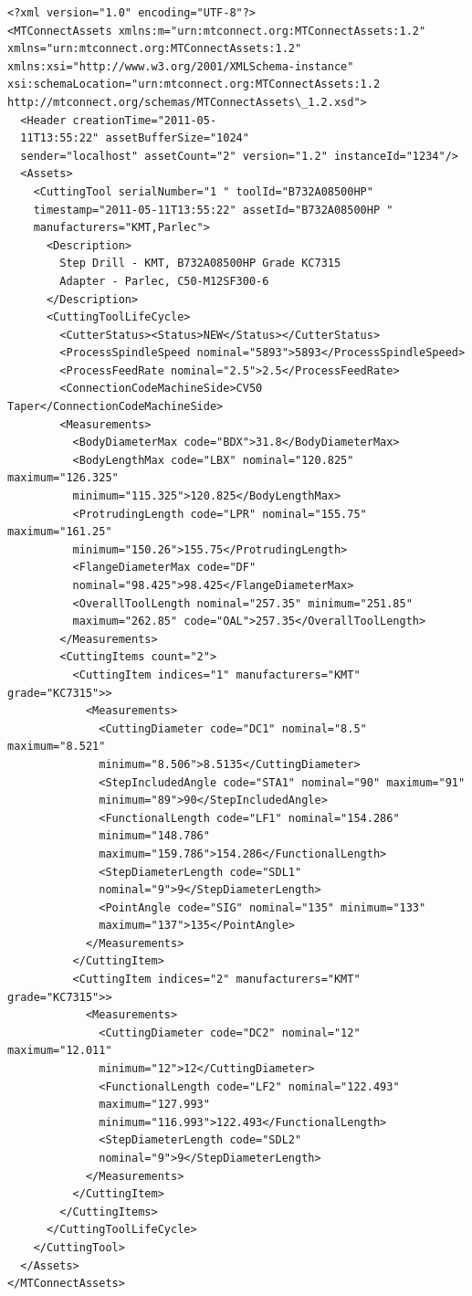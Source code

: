 \begin{lstlisting}[firstnumber=1,escapechar=|,% 
caption={Example for Step Mill Side View}, label={lst:step-drill-side-view}]
<?xml version="1.0" encoding="UTF-8"?>
<MTConnectAssets xmlns:m="urn:mtconnect.org:MTConnectAssets:1.2" 
xmlns="urn:mtconnect.org:MTConnectAssets:1.2" 
xmlns:xsi="http://www.w3.org/2001/XMLSchema-instance" 
xsi:schemaLocation="urn:mtconnect.org:MTConnectAssets:1.2 
http://mtconnect.org/schemas/MTConnectAssets\_1.2.xsd">
  <Header creationTime="2011-05-
  11T13:55:22" assetBufferSize="1024" 
  sender="localhost" assetCount="2" version="1.2" instanceId="1234"/>
  <Assets>
    <CuttingTool serialNumber="1 " toolId="B732A08500HP" 
    timestamp="2011-05-11T13:55:22" assetId="B732A08500HP " 
    manufacturers="KMT,Parlec">
      <Description>
        Step Drill - KMT, B732A08500HP Grade KC7315
        Adapter - Parlec, C50-M12SF300-6
      </Description>
      <CuttingToolLifeCycle>
        <CutterStatus><Status>NEW</Status></CutterStatus>
        <ProcessSpindleSpeed nominal="5893">5893</ProcessSpindleSpeed>
        <ProcessFeedRate nominal="2.5">2.5</ProcessFeedRate>
        <ConnectionCodeMachineSide>CV50 Taper</ConnectionCodeMachineSide>
        <Measurements>
          <BodyDiameterMax code="BDX">31.8</BodyDiameterMax>
          <BodyLengthMax code="LBX" nominal="120.825" maximum="126.325" 
          minimum="115.325">120.825</BodyLengthMax>
          <ProtrudingLength code="LPR" nominal="155.75" maximum="161.25" 
          minimum="150.26">155.75</ProtrudingLength>
          <FlangeDiameterMax code="DF" 
          nominal="98.425">98.425</FlangeDiameterMax>
          <OverallToolLength nominal="257.35" minimum="251.85" 
          maximum="262.85" code="OAL">257.35</OverallToolLength>
        </Measurements>
        <CuttingItems count="2">
          <CuttingItem indices="1" manufacturers="KMT" grade="KC7315">>
            <Measurements>
              <CuttingDiameter code="DC1" nominal="8.5" maximum="8.521" 
              minimum="8.506">8.5135</CuttingDiameter>
              <StepIncludedAngle code="STA1" nominal="90" maximum="91" 
              minimum="89">90</StepIncludedAngle>
              <FunctionalLength code="LF1" nominal="154.286" 
              minimum="148.786" 
              maximum="159.786">154.286</FunctionalLength>
              <StepDiameterLength code="SDL1" 
              nominal="9">9</StepDiameterLength>
              <PointAngle code="SIG" nominal="135" minimum="133" 
              maximum="137">135</PointAngle>
            </Measurements>
          </CuttingItem>
          <CuttingItem indices="2" manufacturers="KMT" grade="KC7315">>
            <Measurements>
              <CuttingDiameter code="DC2" nominal="12" maximum="12.011" 
              minimum="12">12</CuttingDiameter>
              <FunctionalLength code="LF2" nominal="122.493" 
              maximum="127.993" 
              minimum="116.993">122.493</FunctionalLength>
              <StepDiameterLength code="SDL2" 
              nominal="9">9</StepDiameterLength>
            </Measurements>
          </CuttingItem>
        </CuttingItems>
      </CuttingToolLifeCycle>
    </CuttingTool>
  </Assets>
</MTConnectAssets>
\end{lstlisting}

